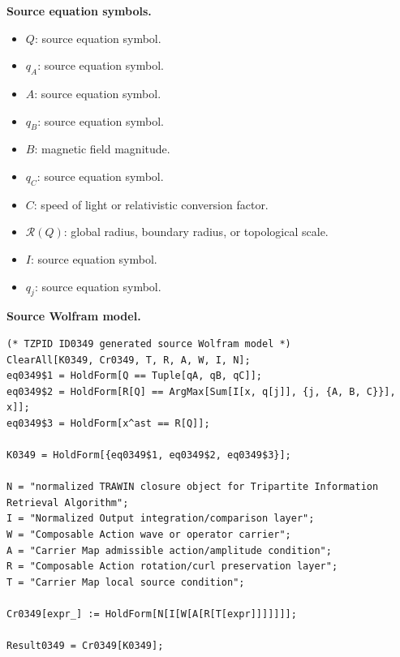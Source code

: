 \begin{minipage}[t]{0.49\linewidth}
\begingroup
\small
\raggedright
\textbf{Source equation symbols.}\par
\begin{itemize}[leftmargin=1.35em,itemsep=1pt,topsep=1pt,parsep=0pt]
    \item $Q$: source equation symbol.
    \item $q_{A}$: source equation symbol.
    \item $A$: source equation symbol.
    \item $q_{B}$: source equation symbol.
    \item $B$: magnetic field magnitude.
    \item $q_{C}$: source equation symbol.
    \item $C$: speed of light or relativistic conversion factor.
    \item $\mathcal{R}(Q)$: global radius, boundary radius, or topological scale.
    \item $I$: source equation symbol.
    \item $q_{j}$: source equation symbol.
\end{itemize}
\endgroup
\end{minipage}\hfill
\begin{minipage}[t]{0.47\linewidth}
\begingroup
\scriptsize
\raggedright
\textbf{Source Wolfram model.}\par
\begin{Verbatim}[fontsize=\tiny,breaklines=true,breakanywhere=true]
(* TZPID ID0349 generated source Wolfram model *)
ClearAll[K0349, Cr0349, T, R, A, W, I, N];
eq0349$1 = HoldForm[Q == Tuple[qA, qB, qC]];
eq0349$2 = HoldForm[R[Q] == ArgMax[Sum[I[x, q[j]], {j, {A, B, C}}], x]];
eq0349$3 = HoldForm[x^ast == R[Q]];

K0349 = HoldForm[{eq0349$1, eq0349$2, eq0349$3}];

N = "normalized TRAWIN closure object for Tripartite Information Retrieval Algorithm";
I = "Normalized Output integration/comparison layer";
W = "Composable Action wave or operator carrier";
A = "Carrier Map admissible action/amplitude condition";
R = "Composable Action rotation/curl preservation layer";
T = "Carrier Map local source condition";

Cr0349[expr_] := HoldForm[N[I[W[A[R[T[expr]]]]]]];

Result0349 = Cr0349[K0349];
\end{Verbatim}
\endgroup
\end{minipage}

